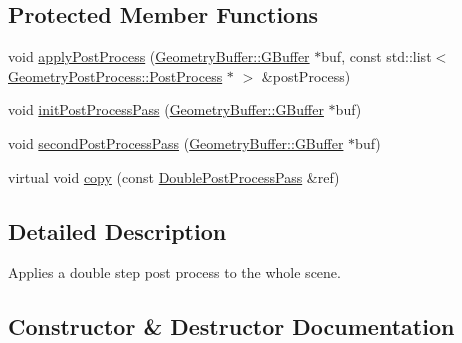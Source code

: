 \subsection*{Protected Member Functions}
\begin{DoxyCompactItemize}
\item 
void \mbox{\hyperlink{class_geometry_engine_1_1_geometry_render_step_1_1_double_post_process_pass_a00a5226374ef0b93b1022444636dc84f}{apply\+Post\+Process}} (\mbox{\hyperlink{class_geometry_engine_1_1_geometry_buffer_1_1_g_buffer}{Geometry\+Buffer\+::\+G\+Buffer}} $\ast$buf, const std\+::list$<$ \mbox{\hyperlink{class_geometry_engine_1_1_geometry_post_process_1_1_post_process}{Geometry\+Post\+Process\+::\+Post\+Process}} $\ast$ $>$ \&post\+Process)
\item 
void \mbox{\hyperlink{class_geometry_engine_1_1_geometry_render_step_1_1_double_post_process_pass_a5ba91461e78b15f545a66a521fb1b4b7}{init\+Post\+Process\+Pass}} (\mbox{\hyperlink{class_geometry_engine_1_1_geometry_buffer_1_1_g_buffer}{Geometry\+Buffer\+::\+G\+Buffer}} $\ast$buf)
\item 
void \mbox{\hyperlink{class_geometry_engine_1_1_geometry_render_step_1_1_double_post_process_pass_a9e20097c5cdd938e362951975810e2a3}{second\+Post\+Process\+Pass}} (\mbox{\hyperlink{class_geometry_engine_1_1_geometry_buffer_1_1_g_buffer}{Geometry\+Buffer\+::\+G\+Buffer}} $\ast$buf)
\item 
virtual void \mbox{\hyperlink{class_geometry_engine_1_1_geometry_render_step_1_1_double_post_process_pass_a1fd491635a67d9d228142c41a66d222b}{copy}} (const \mbox{\hyperlink{class_geometry_engine_1_1_geometry_render_step_1_1_double_post_process_pass}{Double\+Post\+Process\+Pass}} \&ref)
\end{DoxyCompactItemize}


\subsection{Detailed Description}
Applies a double step post process to the whole scene. 

\subsection{Constructor \& Destructor Documentation}
\mbox{\label{class_geometry_engine_1_1_geometry_render_step_1_1_double_post_process_pass_a497f2ab80bdcc0409cdb801069b87a93}} 

